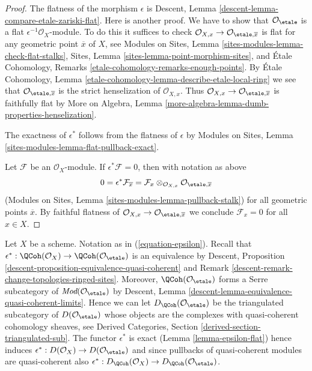 \begin{proof}
The flatness of the morphism $\epsilon$ is
Descent, Lemma \ref{descent-lemma-compare-etale-zariski-flat}.
Here is another proof. We have to show that
$\mathcal{O}_\etale$ is a flat $\epsilon^{-1}\mathcal{O}_X$-module.
To do this it suffices to check
$\mathcal{O}_{X, x} \to \mathcal{O}_{\etale, \overline{x}}$
is flat for any geometric point $\overline{x}$ of $X$, see
Modules on Sites, Lemma
\ref{sites-modules-lemma-check-flat-stalks},
Sites, Lemma
\ref{sites-lemma-point-morphism-sites},
and
\'Etale Cohomology, Remarks
\ref{etale-cohomology-remarks-enough-points}.
By \'Etale Cohomology, Lemma
\ref{etale-cohomology-lemma-describe-etale-local-ring}
we see that $\mathcal{O}_{\etale, \overline{x}}$ is the
strict henselization of $\mathcal{O}_{X, x}$. Thus
$\mathcal{O}_{X, x} \to \mathcal{O}_{\etale, \overline{x}}$
is faithfully flat by More on Algebra,
Lemma \ref{more-algebra-lemma-dumb-properties-henselization}.

\medskip\noindent
The exactness of $\epsilon^*$ follows from the flatness
of $\epsilon$ by
Modules on Sites, Lemma \ref{sites-modules-lemma-flat-pullback-exact}.

\medskip\noindent
Let $\mathcal{F}$ be an $\mathcal{O}_X$-module. If
$\epsilon^*\mathcal{F} = 0$, then with notation as above
$$
0 = \epsilon^*\mathcal{F}_{\overline{x}} =
\mathcal{F}_x \otimes_{\mathcal{O}_{X, x}} \mathcal{O}_{\etale, \overline{x}}
$$
(Modules on Sites, Lemma \ref{sites-modules-lemma-pullback-stalk})
for all geometric points $\overline{x}$. By faithful flatness of
$\mathcal{O}_{X, x} \to \mathcal{O}_{\etale, \overline{x}}$
we conclude $\mathcal{F}_x = 0$ for all $x \in X$.
\end{proof}

\noindent
Let $X$ be a scheme. Notation as in (\ref{equation-epsilon}).
Recall that $\epsilon^* : \QCoh(\mathcal{O}_X)
\to \QCoh(\mathcal{O}_\etale)$
is an equivalence by
Descent, Proposition \ref{descent-proposition-equivalence-quasi-coherent} and
Remark \ref{descent-remark-change-topologies-ringed-sites}.
Moreover, $\QCoh(\mathcal{O}_\etale)$ forms a
Serre subcategory of
$\textit{Mod}(\mathcal{O}_\etale)$ by
Descent, Lemma \ref{descent-lemma-equivalence-quasi-coherent-limits}.
Hence we can let $D_\QCoh(\mathcal{O}_\etale)$ be the triangulated
subcategory of $D(\mathcal{O}_\etale)$ whose objects are the
complexes with quasi-coherent cohomology sheaves, see
Derived Categories, Section \ref{derived-section-triangulated-sub}.
The functor $\epsilon^*$ is exact (Lemma \ref{lemma-epsilon-flat})
hence induces
$\epsilon^* :  D(\mathcal{O}_X) \to D(\mathcal{O}_\etale)$
and since pullbacks of quasi-coherent modules are quasi-coherent
also $\epsilon^* : D_\QCoh(\mathcal{O}_X) \to
D_\QCoh(\mathcal{O}_\etale)$.

